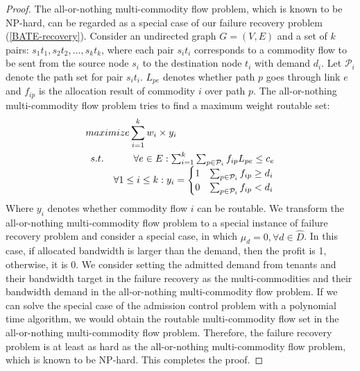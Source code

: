 \documentclass[sigconf]{acmart}
\begin{document}
\begin{appendices}
 
\begin{proof}
The all-or-nothing multi-commodity flow problem, which is known to be NP-hard\cite{inproceedings2}, 
can be regarded as a special case of our failure recovery problem (\ref{BATE-recovery}).
Consider an undirected graph $G = (V,E)$ and a set of $k$ pairs: $s_1t_1, s_2t_2,..., s_kt_k$,
where each pair $s_it_i$ corresponds to a commodity flow to be sent from the source node $s_i$ to the destination node $t_i$ with demand $d_i$.
Let $\mathcal{P}_i$ denote the path set for pair $s_it_i$.
$L_{pe}$ denotes whether path $p$ goes through link $e$ and $f_{ip}$ is the allocation result of commodity $i$ over path $p$.
The  all-or-nothing multi-commodity flow problem tries to find a maximum weight routable set:
\begin{equation}
\begin{aligned} \label{P}
&maximize  \sum_{i=1}^k w_i \times y_i\\
&\begin{array}{r@{\quad}r@{}l@{\quad}l}
s.t. &\forall e \in E: \sum_{i=1}^k\sum_{p\in \mathcal{P}_i}f_{ip}L_{pe} \le c_e \\
     &\forall  1\le i \le k  : y_i=
\begin{cases}
1 &\text{$\sum_{p \in \mathcal{P}_i}f_{ip} \ge d_i$}\\
0 &\text{$\sum_{p\in \mathcal{P}_i}f_{ip} < d_i$}
\end{cases}\\
\end{array}
\end{aligned}
\end{equation}
Where $y_i$ denotes whether commodity flow $i$ can be routable.
We transform the all-or-nothing multi-commodity flow problem to a special instance of
failure recovery problem and consider a special case, in which $\mu_d=0,\forall d \in \hat{D}$.
In this case, if allocated bandwidth is larger than the demand, then the profit is 1, otherwise, it is 0.
We consider setting the admitted demand from tenants and their bandwidth target in 
the failure recovery as the multi-commodities and their bandwidth demand in the all-or-nothing multi-commodity flow problem.
If we can solve the special case of the admission control problem with a polynomial time algorithm, we would obtain the routable multi-commodity flow set  in the all-or-nothing multi-commodity flow problem.  
Therefore, the failure recovery problem  is at least as hard as the all-or-nothing multi-commodity flow
problem, which is known to be NP-hard. This completes the
proof.
\end{proof}

 \end{appendices}
\end{document}

